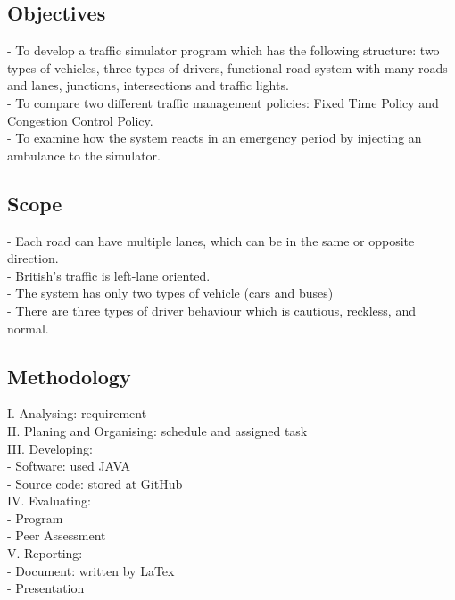 \documentclass[11pt]{article}
\begin{document}
	\subsection{Objectives}
	\indent\indent- To develop a traffic simulator program which has the following structure: two types of vehicles, three types of drivers, functional road system with many roads and lanes, junctions, intersections and traffic lights. \\
	\indent - To compare two different traffic management policies: Fixed Time Policy and Congestion Control Policy. \\
	\indent - To examine how the system reacts in an emergency period  by injecting an ambulance to the simulator. 
	
	\subsection{Scope}	
	\indent\indent - Each road can have multiple lanes, which can be in the same or opposite direction. \\
	\indent - British’s traffic is left-lane oriented. \\
	\indent - The system has only two types of vehicle (cars and buses) \\
	\indent - There are three types of driver behaviour which is  cautious, reckless, and normal. 
	
	\subsection{Methodology} 
	\indent\indent I.	Analysing: requirement \\
	\indent II.	Planing and Organising: schedule and assigned task\\
	\indent III.	Developing: \\
			\indent\indent - Software: used JAVA\\
			\indent\indent - Source code: stored at GitHub\\
	\indent IV.	Evaluating:\\
			\indent\indent - Program\\
			\indent\indent - Peer Assessment\\
	\indent V. 	Reporting:\\
			\indent\indent - Document: written by LaTex\\
			\indent\indent - Presentation
			
\end{document}
